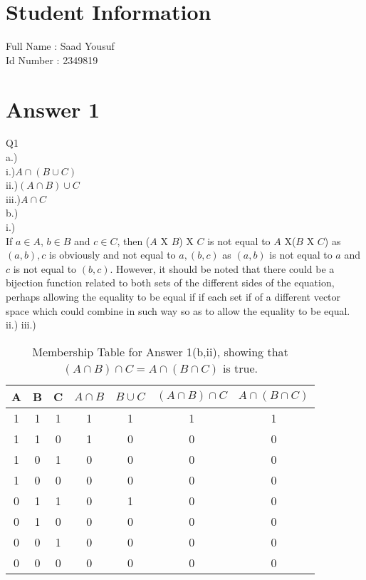 \documentclass[11pt]{article}
\begin{document}
\section*{Student Information } 
Full Name :  Saad Yousuf\\
Id Number :  2349819\\

\section*{Answer 1}
Q1\\
a.)\\
i.)$A \cap (B\cup C)$\\
ii.)$(A \cap B)\cup C$\\
iii.)$A \cap C$\\
b.)\\
i.)\\
If $a \in A$, $b \in B$ and $c \in C$, then ($A$ X $B$) X $C$ is not equal to $A$ X($B$ X $C$) as {$(a,b),c$} is obviously and not equal to {$a,(b,c)$} as $(a,b)$ is not equal to $a$ and $c$ is not equal to $(b,c)$. However, it should be noted that there could be a bijection function related to both sets of the different sides of the equation, perhaps allowing the equality to be equal if if each set if of a different vector space which could combine in such way so as to allow the equality to be equal.\\

ii.) iii.)\\
\begin{table}[h]
\small
\centering
\caption{Membership Table for Answer 1(b,ii), showing that $(A\cap B)\cap C = A \cap(B \cap C)$ is true.}
\label{table:example}
\begin{tabular}{|c|c|c|c|c|c|c}	%
\hline 							%
\textbf{A} & \textbf{B} & \textbf{C} & \textbf{$A \cap B$} & \textbf{$B \cup C$} & \textbf{$(A \cap B)\cap C$} & \textbf{$A \cap (B \cap C)$}\\%
\hline 
\hline 
1 & 1 & 1 & 1 & 1 & 1 & 1 \\%
1 & 1 & 0 & 1 & 0 & 0 & 0 \\
1 & 0 & 1 & 0 & 0 & 0 & 0 \\
1 & 0 & 0 & 0 & 0 & 0 & 0 \\
0 & 1 & 1 & 0 & 1 & 0 & 0 \\
0 & 1 & 0 & 0 & 0 & 0 & 0 \\
0 & 0 & 1 & 0 & 0 & 0 & 0 \\
0 & 0 & 0 & 0 & 0 & 0 & 0 \\
\hline


\end{tabular}
\end{table}
\end{document}
